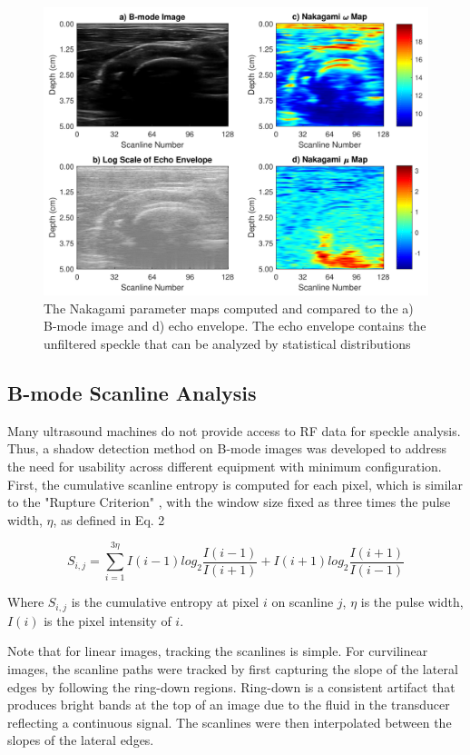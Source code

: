 \documentclass[preprint,5p,authoryear]{elsarticle}
\begin{document}
\begin{figure}[H]
	\includegraphics[scale=0.5]{fig2.pdf}
	\caption{The Nakagami parameter maps computed and compared to the a) B-mode image and d) echo envelope. The echo envelope contains the unfiltered speckle that can be analyzed by statistical distributions}
\end{figure}

\subsection*{B-mode Scanline Analysis}

Many ultrasound machines do not provide access to RF data  for speckle analysis. Thus, a shadow detection method on B-mode images was developed to address the need for usability across different equipment with minimum configuration. First, the cumulative scanline entropy is computed for each pixel, which is similar to the "Rupture Criterion" \citep{Hellier2010}, with the window size fixed as three times the pulse width, $\eta$, as defined in Eq. 2

\begin{equation}
S_{i,j} = \sum_{i=1}^{3\eta}I(i-1)log_{2}\frac{I(i-1)}{I(i+1)}+I(i+1)log_{2}\frac{I(i+1)}{I(i-1)}
\end{equation}

Where $S_{i,j}$ is the cumulative entropy at pixel $i$ on scanline $j$, $\eta$ is the pulse width, $I(i)$ is the pixel intensity of $i$.

Note that for linear images, tracking the scanlines is simple. For curvilinear images, the scanline paths were tracked by first capturing the slope of the lateral edges by following the ring-down regions. Ring-down is a consistent artifact that produces bright bands at the top of an image due to the fluid in the transducer reflecting a continuous signal. The scanlines were then interpolated between the slopes of the lateral edges.
\end{document}
